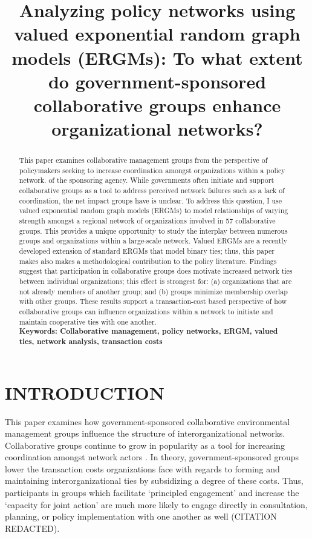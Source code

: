 \documentclass[12pt,a4paper,titlepage]{article}
\title{Analyzing policy networks using valued exponential random graph models (ERGMs): To what extent do government-sponsored collaborative groups enhance organizational networks?}
\begin{document}
\singlespacing
\maketitle

\begin{abstract}
\singlespacing

This paper examines collaborative management groups from the perspective of policymakers seeking to increase coordination amongst organizations within a policy network. of the sponsoring agency. While governments often initiate and support collaborative groups as a tool to address perceived network failures such as a lack of coordination, the net impact groups have is unclear. To address this question, I use valued exponential random graph models (ERGMs) to model relationships of varying strength amongst a regional network of organizations involved in 57 collaborative groups. This provides a unique opportunity to study the interplay between numerous groups and organizations within a large-scale network. Valued ERGMs are a recently developed extension of standard ERGMs that model binary ties; thus, this paper makes also makes a methodological contribution to the policy literature. Findings suggest that participation in collaborative groups does motivate increased network ties between individual organizations; this effect is strongest for: (a) organizations that are not already members of another group; and (b) groups minimize membership overlap with other groups. These results support a transaction-cost based perspective of how collaborative groups can influence organizations within a network to initiate and maintain cooperative ties with one another.\\



\noindent
\bf{Keywords}: Collaborative management, policy networks, ERGM, valued ties, network analysis, transaction costs
\end{abstract}

\doublespacing
\section{\bf\MakeUppercase{Introduction}}

This paper examines how government-sponsored collaborative environmental management groups influence the structure of interorganizational networks. Collaborative groups continue to grow in popularity as a tool for increasing coordination amongst network actors \parencite{margerum2011}. In theory, government-sponsored groups lower the transaction costs organizations face with regards to forming and maintaining interorganizational ties by subsidizing a degree of these costs. Thus, participants in groups which facilitate `principled engagement' and increase the `capacity for joint action' \parencite{emerson2012} are much more likely to engage directly in consultation, planning, or policy implementation with one another as well (CITATION REDACTED).
\end{document}
